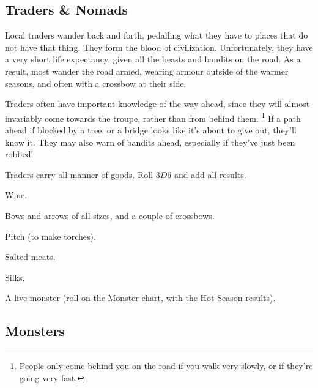 \begin{multicols}{2}
\begin{multicols}{2}
\begin{dlist}
  \showBandits
  \showBandits
  \showBandits
  \showBandits
  \showBandits
  \showBandits
\end{dlist}
\end{multicols}

\subsection{Traders \& Nomads}

Local traders wander back and forth, pedalling what they have to places that do not have that thing.
They form the blood of civilization.
Unfortunately, they have a very short life expectancy, given all the beasts and bandits on the road.
As a result, most wander the road armed, wearing armour outside of the warmer seasons, and often with a crossbow at their side.

Traders often have important knowledge of the way ahead, since they will almost invariably come towards the troupe, rather than from behind them.%
\footnote{People only come behind you on the road if you walk very slowly, or if they're going very fast.}
If a path ahead if blocked by a tree, or a bridge looks like it's about to give out, they'll know it.
They may also warn of bandits ahead, especially if they've just been robbed!

Traders carry all manner of goods.
Roll $3D6$ and add all results.

\begin{multicols}{2}
\begin{dlist}
  \item
  Wine.
  \item
  Bows and arrows of all sizes, and a couple of crossbows.
  \item
  Pitch (to make torches).
  \item
  Salted meats.
  \item
  Silks.
  \item
  A live monster (roll on the Monster chart, with the Hot Season results).
\end{dlist}
\end{multicols}

\subsection{Monsters}


\end{multicols}
